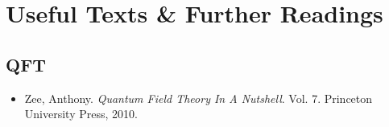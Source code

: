 \chapter*{Useful Texts \& Further Readings}

\section*{QFT}
\begin{itemize}
    \item Zee, Anthony. \textit{Quantum Field Theory In A Nutshell}. Vol. 7. Princeton University Press, 2010.
\end{itemize}


